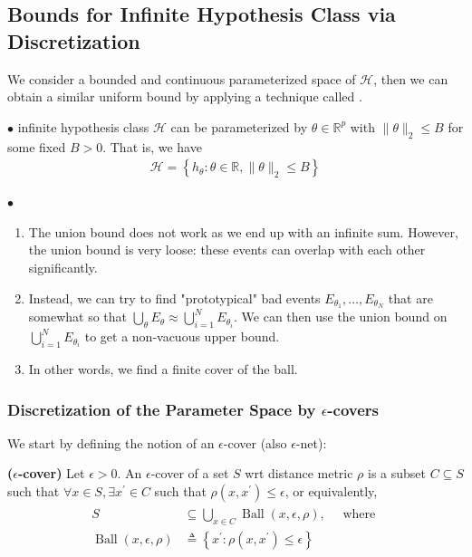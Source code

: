 \documentclass{article}
\newcommand{\bfs}[1]{\textbf{({#1}) }}
\begin{document}
\subsection{Bounds for Infinite Hypothesis Class via Discretization}
We consider a bounded and continuous parameterized space of $\mathcal{H}$, then we can obtain a similar uniform bound by applying a technique called .

$\bullet$  infinite hypothesis class $\mathcal{H}$ can be parameterized by $\theta \in \mathbb{R}^{p}$ with $\|\theta\|_{2} \leq B$ for some fixed $B>0$. That is, we have
\begin{align*}
\mathcal{H}=\left\{h_{\theta}: \theta \in \mathbb{R},\|\theta\|_{2} \leq B\right\}
\end{align*}

$\bullet$ 
\begin{enumerate}
    \item The union bound does not work as we end up with an infinite sum. However, the union bound is very loose: these events can overlap with each other significantly. 
    \item Instead, we can try to find "prototypical" bad events $E_{\theta_{1}}, \ldots, E_{\theta_{N}}$ that are somewhat  so that $\bigcup_{\theta} E_{\theta} \approx \bigcup_{i=1}^{N} E_{\theta_{i}} .$ We can then use the union bound on $\bigcup_{i=1}^{N} E_{\theta_{i}}$ to get a non-vacuous upper bound. 
    \item In other words, we find a finite cover of the ball.
\end{enumerate}
\subsubsection{Discretization of the Parameter Space by $\epsilon$-covers}
We start by defining the notion of an $\epsilon$-cover (also $\epsilon$-net):
\begin{defa}\bfs{$\epsilon$-cover}\label{def:hkjererqre}
 Let $\epsilon>0 .$ An $\epsilon$-cover of a set $S$ \gls{wrt} distance metric $\rho$ is a subset $C \subseteq S$ such that $\forall x \in S, \exists x^{\prime} \in C$ such that $\rho\left(x, x^{\prime}\right) \leq \epsilon$, or equivalently,
\begin{align*}
\begin{aligned}
S & \subseteq \bigcup_{x \in C} \operatorname{Ball}(x, \epsilon, \rho), \quad \text { where } \\
\operatorname{Ball}(x, \epsilon, \rho) & \triangleq\left\{x^{\prime}: \rho\left(x, x^{\prime}\right) \leq \epsilon\right\}
\end{aligned}
\end{align*}
\end{defa}
\end{document}
